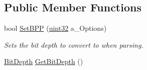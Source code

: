 \subsection*{Public Member Functions}
\begin{DoxyCompactItemize}
\item 
bool \hyperlink{classtil_1_1_image_ae1202f84c0addb81eba161f746a9d4cc}{SetBPP} (\hyperlink{namespacetil_a20db61688ed403d11f057a508d87e54c}{uint32} a\_\-Options)
\begin{DoxyCompactList}\small\item\em Sets the bit depth to convert to when parsing. \item\end{DoxyCompactList}\item 
\hypertarget{classtil_1_1_image_a33311ad048e924086afffabe7a21029d}{
\hyperlink{classtil_1_1_image_a621d337ba744563ed6bde962e08dfbc8}{BitDepth} \hyperlink{classtil_1_1_image_a33311ad048e924086afffabe7a21029d}{GetBitDepth} ()}
\label{classtil_1_1_image_a33311ad048e924086afffabe7a21029d}


\end{DoxyCompactItemize}

